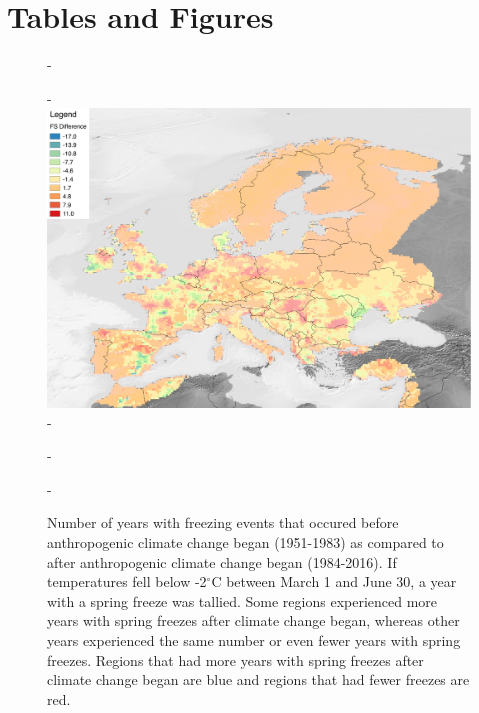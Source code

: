 \documentclass{article}\usepackage[]{graphicx}\usepackage[]{color}
\begin{document}


\section*{Tables and Figures}

{\begin{figure} [H]
  -\begin{center}
  -\includegraphics[width=12cm]{..//figures/FS_Diff.pdf}
  -\caption{Number of years with freezing events that occured before anthropogenic climate change began (1951-1983) as compared to after anthropogenic climate change began (1984-2016). If temperatures fell below -2$^{\circ}$C between March 1 and June 30, a year with a spring freeze was tallied. Some regions experienced more years with spring freezes after climate change began, whereas other years experienced the same number or even fewer years with spring freezes. Regions that had more years with spring freezes after climate change began are blue and regions that had fewer freezes are red.}\label{fig:region}
  -\end{center}
  -\end{figure}}
  
\end{document}
